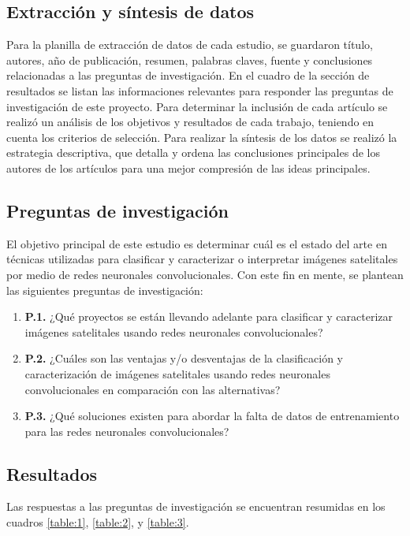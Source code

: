 \subsection{Extracción y síntesis de datos}

Para la planilla de extracción de datos de cada estudio, se guardaron título, autores, año de publicación, resumen, palabras claves, fuente y conclusiones relacionadas a las preguntas de investigación. En el cuadro de la sección de resultados se listan las informaciones relevantes para responder las preguntas de investigación de este proyecto. Para determinar la inclusión de cada artículo se realizó un análisis de los objetivos y resultados de cada trabajo, teniendo en cuenta los criterios de selección. Para realizar la síntesis de los datos se realizó la estrategia descriptiva, que detalla y ordena las conclusiones principales de los autores de los artículos para una mejor compresión de las ideas principales.

\subsection{Preguntas de investigación}

El objetivo principal de este estudio es determinar cuál es el estado del arte en técnicas utilizadas para clasificar y caracterizar o interpretar imágenes satelitales por medio de redes neuronales convolucionales. Con este fin en mente, se plantean las siguientes preguntas de investigación:

\begin{enumerate}
    \item[] {\bf P.1.} ¿Qué proyectos se están llevando adelante para clasificar y caracterizar imágenes satelitales usando redes neuronales convolucionales?
    \item[] {\bf P.2.} ¿Cuáles son las ventajas y/o desventajas de la clasificación y caracterización de imágenes satelitales usando redes neuronales convolucionales en comparación con las alternativas?
    \item[] {\bf P.3.} ¿Qué soluciones existen para abordar la falta de datos de entrenamiento para las redes neuronales convolucionales?
\end{enumerate}

\subsection{Resultados}

Las respuestas a las preguntas de investigación se encuentran resumidas en los cuadros \ref{table:1}, \ref{table:2}, y \ref{table:3}.

